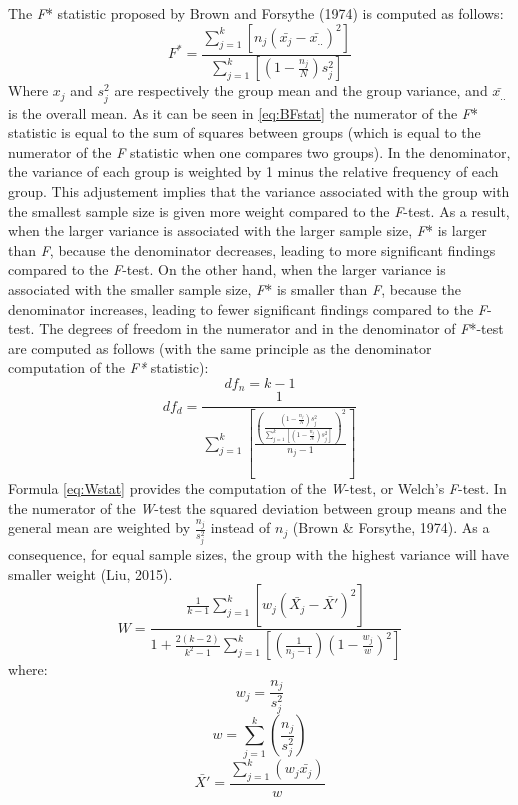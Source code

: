 \documentclass[man,floatsintext]{apa6}
\begin{document}
The \emph{F}* statistic proposed by Brown and Forsythe (1974) is computed as follows:
\begin{equation} 
F^*= \frac{\sum_{j=1}^k[n_j(\bar{x_j}-\bar{x_{..}})^2]}{\sum_{j=1}^k [(1-\frac{n_j}{N})s_j^2]}
\label{eq:BFstat}
\end{equation}
Where \(x_j\) and \(s_j^2\) are respectively the group mean and the group variance, and \(\bar{x_{..}}\) is the overall mean. As it can be seen in \eqref{eq:BFstat} the numerator of the \emph{F}* statistic is equal to the sum of squares between groups (which is equal to the numerator of the \emph{F} statistic when one compares two groups). In the denominator, the variance of each group is weighted by 1 minus the relative frequency of each group. This adjustement implies that the variance associated with the group with the smallest sample size is given more weight compared to the \emph{F}-test. As a result, when the larger variance is associated with the larger sample size, \emph{F}* is larger than \emph{F}, because the denominator decreases, leading to more significant findings compared to the \emph{F}-test. On the other hand, when the larger variance is associated with the smaller sample size, \emph{F}* is smaller than \emph{F}, because the denominator increases, leading to fewer significant findings compared to the \emph{F}-test. The degrees of freedom in the numerator and in the denominator of \emph{F}*-test are computed as follows (with the same principle as the denominator computation of the \emph{F*} statistic):
\begin{equation} 
df_n= k-1
\label{eq:BFnumDF}
\end{equation}
\begin{equation} 
df_d= \frac{1}{\sum_{j=1}^k[\frac{(\frac{(1-\frac{n_j}{N})s_j^2}{\sum_{j=1}^k[(1-\frac{n_j}{N})s_j^2]})^2}{n_j-1}]}
\label{eq:BFdenomDF}
\end{equation}
Formula \eqref{eq:Wstat} provides the computation of the \emph{W}-test, or Welch's \emph{F}-test. In the numerator of the \emph{W}-test the squared deviation between group means and the general mean are weighted by \(\frac{n_j}{s_j^2}\) instead of \(n_j\) (Brown \& Forsythe, 1974). As a consequence, for equal sample sizes, the group with the highest variance will have smaller weight (Liu, 2015). \begin{equation} 
W=\frac{\frac{1}{k-1}\sum_{j=1}^k[w_j(\bar{X_j}-\bar{X'})^2]}
{1+\frac{2(k-2)}{k^2-1}\sum_{j=1}^k[(\frac{1}{n_j-1})(1-\frac{w_j}{w})^2]}
\label{eq:Wstat}
\end{equation}
where:
\[w_j=\frac{n_j}{s_j^2}\]
\[w=\sum_{j=1}^k(\frac{n_j}{s_j^2})\]
\[\bar{X'}=\frac{\sum_{j=1}^k(w_j\bar{x_j})}{w}\]
\end{document}
